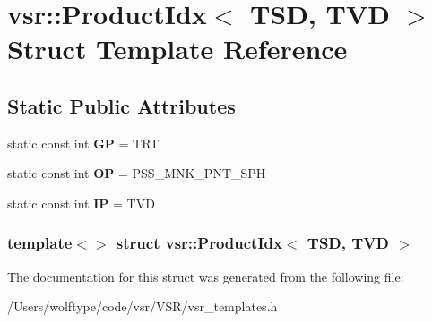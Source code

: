 \hypertarget{structvsr_1_1_product_idx_3_01_t_s_d_00_01_t_v_d_01_4}{\section{vsr\-:\-:Product\-Idx$<$ T\-S\-D, T\-V\-D $>$ Struct Template Reference}
\label{structvsr_1_1_product_idx_3_01_t_s_d_00_01_t_v_d_01_4}
}
\subsection*{Static Public Attributes}
\begin{DoxyCompactItemize}
\item 
\hypertarget{structvsr_1_1_product_idx_3_01_t_s_d_00_01_t_v_d_01_4_a365f8666a96ac56e3cb1d8756a9865eb}{static const int {\bfseries G\-P} = T\-R\-T}\label{structvsr_1_1_product_idx_3_01_t_s_d_00_01_t_v_d_01_4_a365f8666a96ac56e3cb1d8756a9865eb}

\item 
\hypertarget{structvsr_1_1_product_idx_3_01_t_s_d_00_01_t_v_d_01_4_a50c40d63d303519456693b36b21aca0a}{static const int {\bfseries O\-P} = P\-S\-S\-\_\-\-M\-N\-K\-\_\-\-P\-N\-T\-\_\-\-S\-P\-H}\label{structvsr_1_1_product_idx_3_01_t_s_d_00_01_t_v_d_01_4_a50c40d63d303519456693b36b21aca0a}

\item 
\hypertarget{structvsr_1_1_product_idx_3_01_t_s_d_00_01_t_v_d_01_4_aa67ba2c029f6d7505b1c887621f0ed95}{static const int {\bfseries I\-P} = T\-V\-D}\label{structvsr_1_1_product_idx_3_01_t_s_d_00_01_t_v_d_01_4_aa67ba2c029f6d7505b1c887621f0ed95}

\end{DoxyCompactItemize}
\subsubsection*{template$<$$>$ struct vsr\-::\-Product\-Idx$<$ T\-S\-D, T\-V\-D $>$}



The documentation for this struct was generated from the following file\-:\begin{DoxyCompactItemize}
\item 
/\-Users/wolftype/code/vsr/\-V\-S\-R/vsr\-\_\-templates.\-h\end{DoxyCompactItemize}
